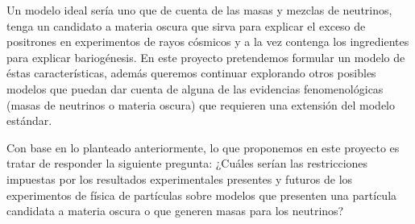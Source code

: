 Un modelo ideal sería uno que de cuenta de las masas y mezclas de
neutrinos, tenga un candidato a materia oscura que sirva para explicar
el exceso de positrones en experimentos de rayos cósmicos y a la vez
contenga los ingredientes para explicar bariogénesis.  En este
proyecto pretendemos formular un modelo de éstas características,
además queremos continuar explorando otros posibles modelos que puedan
dar cuenta de alguna de las evidencias fenomenológicas (masas de
neutrinos o materia oscura) que requieren una extensión del modelo
estándar.


\begin{proyecto}
  Con base en lo planteado anteriormente, lo que proponemos en este
  proyecto es tratar de responder la siguiente pregunta: ¿Cuáles
  serían las restricciones impuestas por los resultados experimentales
  presentes y futuros de los experimentos de física de partículas
  sobre modelos que presenten una partícula candidata a materia oscura
  o que generen masas para los neutrinos?
\end{proyecto}
 



